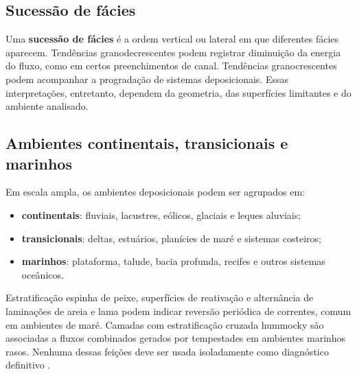 \subsection{Sucessão de fácies}

Uma \textbf{sucessão de fácies} é a ordem vertical ou lateral em que diferentes fácies
aparecem. Tendências granodecrescentes podem registrar diminuição da energia do fluxo,
como em certos preenchimentos de canal. Tendências granocrescentes podem acompanhar a
progradação de sistemas deposicionais. Essas interpretações, entretanto, dependem da
geometria, das superfícies limitantes e do ambiente analisado.

\subsection{Ambientes continentais, transicionais e marinhos}

Em escala ampla, os ambientes deposicionais podem ser agrupados em:

\begin{itemize}
  \item \textbf{continentais}: fluviais, lacustres, eólicos, glaciais e leques aluviais;
  \item \textbf{transicionais}: deltas, estuários, planícies de maré e sistemas costeiros;
  \item \textbf{marinhos}: plataforma, talude, bacia profunda, recifes e outros sistemas
        oceânicos.
\end{itemize}

Estratificação espinha de peixe, superfícies de reativação e alternância de laminações de
areia e lama podem indicar reversão periódica de correntes, comum em ambientes de maré.
Camadas com estratificação cruzada hummocky são associadas a fluxos combinados gerados
por tempestades em ambientes marinhos rasos. Nenhuma dessas feições deve ser usada
isoladamente como diagnóstico definitivo \parencite{harms1975,nichols2009}.
